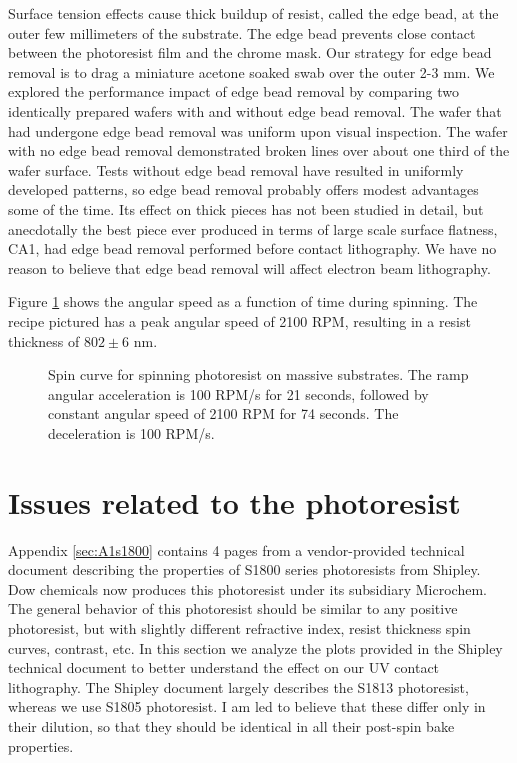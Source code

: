 Surface tension effects cause thick buildup of resist, called the edge bead, at the outer few millimeters of the substrate.  The edge bead prevents close contact between the photoresist film and the chrome mask.  Our strategy for edge bead removal is to drag a miniature acetone soaked swab over the outer 2-3 mm.  We explored the performance impact of edge bead removal by comparing two identically prepared wafers with and without edge bead removal.  The wafer that had undergone edge bead removal was uniform upon visual inspection.  The wafer with no edge bead removal demonstrated broken lines over about one third of the wafer surface.  Tests without edge bead removal have resulted in uniformly developed patterns, so edge bead removal probably offers modest advantages some of the time.  Its effect on thick pieces has not been studied in detail, but anecdotally the best piece ever produced in terms of large scale surface flatness, CA1, had edge bead removal performed before contact lithography.  We have no reason to believe that edge bead removal will affect electron beam lithography.  

Figure \ref{fig:spincurve} shows the angular speed as a function of time during spinning.  The recipe pictured has a peak angular speed of 2100 RPM, resulting in a resist thickness of $802 \pm 6 $ nm.  

\begin{figure}[h!] 
\begin{center}
\caption[Photoresist spin curve]{Spin curve for spinning photoresist on massive substrates.  The ramp angular acceleration is 100 RPM/s for 21 seconds, followed by constant angular speed of 2100 RPM for 74 seconds.  The deceleration is 100 RPM/s.}
\label{fig:spincurve}
\end{center}
\end{figure}

\section{Issues related to the photoresist}
Appendix \ref{sec:A1s1800} contains 4 pages from a vendor-provided technical document describing the properties of S1800 series photoresists from Shipley.  Dow chemicals now produces this photoresist under its subsidiary Microchem.  The general behavior of this photoresist should be similar to any positive photoresist, but with slightly different refractive index, resist thickness spin curves, contrast, etc.  In this section we analyze the plots provided in the Shipley technical document to better understand the effect on our UV contact lithography.  The Shipley document largely describes the S1813 photoresist, whereas we use S1805 photoresist.  I am led to believe that these differ only in their dilution, so that they should be identical in all their post-spin bake properties.

